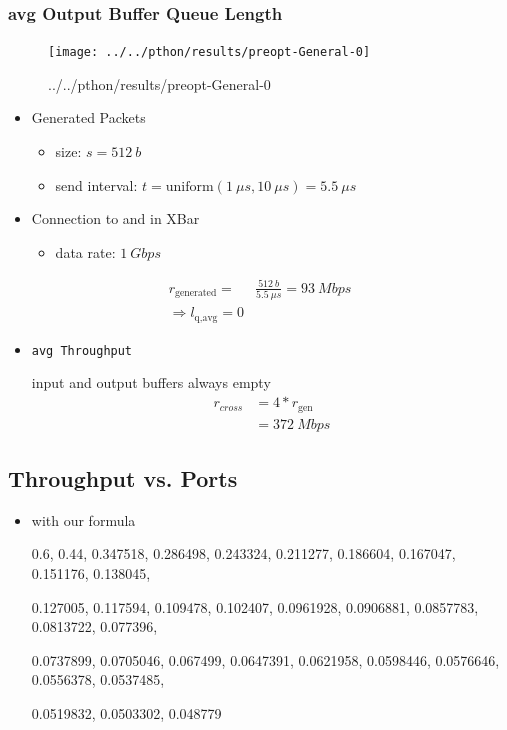\documentclass[]{scrartcl}
\begin{document}
    \subsubsection{avg Output Buffer Queue Length}
        \begin{figure}[ht]
            \centering
            \texttt{[image: ../../pthon/results/preopt-General-0]}
            \caption{../../pthon/results/preopt-General-0}%
            \label{fig:../../pthon/results/preopt-General-0}
        \end{figure}
        \begin{itemize}
            \item Generated Packets
                \begin{itemize}
                    \item size: $ s = \SI{512}{b}$
                    \item send interval: $ t = \text{uniform}(\SI{1}{\mu s}, \SI{10}{\mu s}) = \SI{5.5}{\mu s}$
                \end{itemize}
            \item Connection to and in XBar
                \begin{itemize}
                    \item data rate: $\SI{1}{Gbps}$
                \end{itemize}
        \end{itemize}
        \begin{align}
            r_\text{generated} =& \frac{\SI{512}{b}}{\SI{5.5}{\mu s}} = \SI{93}{Mbps}\\
            \Rightarrow l_\text{q,avg} = 0
        \end{align}
    \begin{itemize}
        \item \verb|avg Throughput|

            input and output buffers always empty
            \begin{align}
                r_{cross} &= 4*r_\text{gen}\\
                &= \SI{372}{Mbps}
            \end{align}
    \end{itemize}
    \subsection{Throughput vs. Ports}
    \begin{itemize}
        \item with our formula
            {0.6, 0.44, 0.347518, 0.286498, 0.243324, 0.211277, 0.186604, 0.167047, 0.151176, 0.138045,

    0.127005, 0.117594, 0.109478, 0.102407, 0.0961928, 0.0906881, 0.0857783, 0.0813722, 0.077396,

    0.0737899, 0.0705046, 0.067499, 0.0647391, 0.0621958, 0.0598446, 0.0576646, 0.0556378, 0.0537485,

    0.0519832, 0.0503302, 0.048779}
    \end{itemize}
\end{document}
